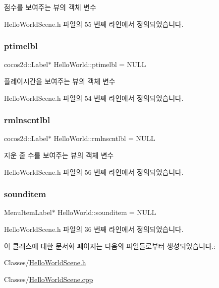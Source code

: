 점수를 보여주는 뷰의 객체 변수 



Hello\+World\+Scene.\+h 파일의 55 번째 라인에서 정의되었습니다.

\mbox{\label{class_hello_world_ae0520bbadc78c24a50ddeb3f839b4012}} 
\subsubsection{\texorpdfstring{ptimelbl}{ptimelbl}}
{\footnotesize\ttfamily cocos2d\+::\+Label$\ast$ Hello\+World\+::ptimelbl = N\+U\+LL\hspace{0.3cm}{\ttfamily [protected]}}



플레이시간을 보여주는 뷰의 객체 변수 



Hello\+World\+Scene.\+h 파일의 54 번째 라인에서 정의되었습니다.

\mbox{\label{class_hello_world_a52aca4f2a78e6413ace505d313b006fc}} 
\subsubsection{\texorpdfstring{rmlnscntlbl}{rmlnscntlbl}}
{\footnotesize\ttfamily cocos2d\+::\+Label$\ast$ Hello\+World\+::rmlnscntlbl = N\+U\+LL\hspace{0.3cm}{\ttfamily [protected]}}



지운 줄 수를 보여주는 뷰의 객체 변수 



Hello\+World\+Scene.\+h 파일의 56 번째 라인에서 정의되었습니다.

\mbox{\label{class_hello_world_adb09915c0ac4077d51f46e2645bc4c0a}} 
\subsubsection{\texorpdfstring{sounditem}{sounditem}}
{\footnotesize\ttfamily Menu\+Item\+Label$\ast$ Hello\+World\+::sounditem = N\+U\+LL}



Hello\+World\+Scene.\+h 파일의 36 번째 라인에서 정의되었습니다.



이 클래스에 대한 문서화 페이지는 다음의 파일들로부터 생성되었습니다.\+:\begin{DoxyCompactItemize}
\item 
Classes/\hyperlink{_hello_world_scene_8h}{Hello\+World\+Scene.\+h}\item 
Classes/\hyperlink{_hello_world_scene_8cpp}{Hello\+World\+Scene.\+cpp}\end{DoxyCompactItemize}
